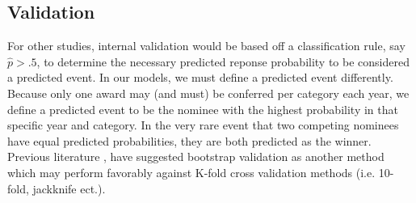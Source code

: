 \documentclass[jou,apacite]{apa6}
\begin{document}
\subsection{Validation}
For other studies, internal validation would be based off a classification rule, say $\widehat{p} > .5$, to determine the necessary predicted reponse probability to be considered a predicted event. In our models, we must define a predicted event differently. Because only one award may (and must) be conferred per category each year, we define a predicted event to be the nominee with the highest probability in that specific year and category. In the very rare event that two competing nominees have equal predicted probabilities, they are both predicted as the winner. Previous literature \cite{steyerberg01}, \cite{austin04} have suggested bootstrap validation as another method which may perform favorably against K-fold cross validation methods (i.e. 10-fold, jackknife ect.).
\end{document}

